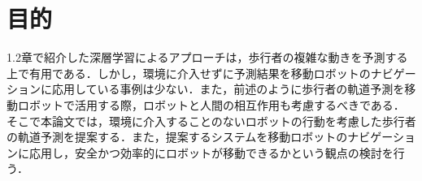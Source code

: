 
\section{目的}
1.2章で紹介した深層学習によるアプローチは，歩行者の複雑な動きを予測する上で有用である．しかし，環境に介入せずに予測結果を移動ロボットのナビゲーションに応用している事例は少ない．また，前述のように歩行者の軌道予測を移動ロボットで活用する際，ロボットと人間の相互作用も考慮するべきである．
そこで本論文では，環境に介入することのないロボットの行動を考慮した歩行者の軌道予測を提案する．また，提案するシステムを移動ロボットのナビゲーションに応用し，安全かつ効率的にロボットが移動できるかという観点の検討を行う．

